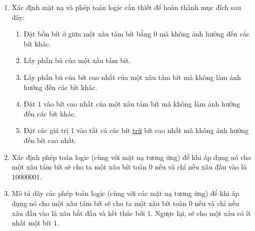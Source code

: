 \begin{multicols}{2}
\begin{enumerate}

  \item Xác định mặt nạ và phép toán logic cần thiết để hoàn thành mục đích sau đây:
    \begin{enumerate}
    \item Đặt bốn bít ở giữa một xâu tám bít bằng $0$ mà không ảnh hưởng đến các bít khác.

    \item Lấy phần bù của một xâu tám bít.

    \item Lấy phần bù của bít cao nhất của một xâu tám bít mà không làm ảnh hưởng đến các
      bít khác.

    \item Đặt $1$ vào bít cao nhất của một xâu tám bít mà không làm ảnh hưởng đến các bít
      khác.

    \item Đặt các giá trị $1$ vào tất cả các bít \underline{trừ} bít cao nhất mà không ảnh
      hưởng đến bít cao nhất.
    \end{enumerate}

  \item Xác định phép toán logic (cùng với mặt nạ tương ứng) để khi áp dụng nó cho một xâu
    tám bít sẽ cho ta một xâu bít toàn $0$ nếu và chỉ nếu xâu đầu vào là $10000001$.

  \item Mô tả dãy các phép toán logic (cùng với các mặt nạ tương ứng) để khi áp dụng nó
    cho một xâu tám bít sẽ cho ta một xâu bít toàn $0$ nếu và chỉ nếu xâu đầu vào là xâu
    bắt đầu và kết thúc bởi $1$. Ngược lại, sẽ cho một xâu có ít nhất một bít $1$.


\end{enumerate}
\end{multicols}
